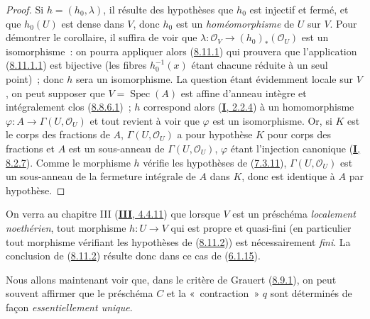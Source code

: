 \begin{proof}
Si $h=(h_0,\lambda)$, il résulte des hypothèses que $h_0$ est injectif et
fermé, et que $h_0(U)$
est dense dans $V$, donc $h_0$ est un \emph{homéomorphisme} de $U$ sur $V$.
Pour démontrer le corollaire, il suffira de voir que
$\lambda:\mathcal{O}_V\to(h_0)_*(\mathcal{O}_U)$ est un isomorphisme~: on
pourra appliquer alors (\hyperref[II.8.11.1-fr]{8.11.1}) qui prouvera que
l'application (\hyperref[II.8.11.1.1-fr]{8.11.1.1}) est bijective (les fibres
$h_0^{-1}(x)$ étant chacune réduite à un seul point)~; donc $h$ sera un
isomorphisme. La question étant évidemment locale sur $V$, on peut supposer
que $V=\operatorname{Spec}(A)$ est affine d'anneau intègre et intégralement
clos (\hyperref[II.8.8.6.1-fr]{8.8.6.1})~; $h$ correspond alors
(\hyperref[I.2.2.4-fr]{\textbf{I}, 2.2.4}) à un homomorphisme
$\varphi:A\to\Gamma(U,\mathcal{O}_U)$ et tout revient à voir que $\varphi$
est un isomorphisme. Or, si $K$ est le corps des fractions de $A$,
$\Gamma(U,\mathcal{O}_U)$ a pour hypothèse $K$ pour corps des fractions et $A$
est un sous-anneau de $\Gamma(U,\mathcal{O}_U)$, $\varphi$ étant l'injection
canonique (\hyperref[I.8.2.7-fr]{\textbf{I}, 8.2.7}). Comme le morphisme $h$ vérifie
les hypothèses de (\hyperref[II.7.3.11-fr]{7.3.11}),
$\Gamma(U,\mathcal{O}_U)$ est un sous-anneau de la fermeture intégrale de $A$
dans $K$, donc est identique à $A$ par hypothèse.
\end{proof}

\begin{remark}[8.11.3]
\label{II.8.11.3-fr}
On verra au chapitre III (\hyperref[III.4.4.11-fr]{\textbf{III}, 4.4.11}) que lorsque
$V$ est un préschéma \emph{localement noethérien}, tout morphisme $h:U\to V$
qui est propre et quasi-fini (en particulier tout morphisme vérifiant les
hypothèses de (\hyperref[II.8.11.2-fr]{8.11.2})) est nécessairement
\emph{fini}. La conclusion de (\hyperref[II.8.11.2-fr]{8.11.2}) résulte donc
dans ce cas de (\hyperref[II.6.1.15-fr]{6.1.15}).
\end{remark}

\begin{env}[8.11.4]
\label{II.8.11.4-fr}
Nous allons maintenant voir que, dans le critère de Grauert
(\hyperref[II.8.9.1-fr]{8.9.1}), on peut souvent affirmer que le préschéma
$C$ et la «~contraction~» $q$ sont déterminés de façon \emph{essentiellement
unique}.
\end{env}

